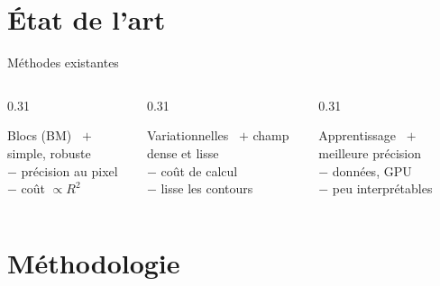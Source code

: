 \documentclass[aspectratio=169, 11pt]{beamer}
\begin{document}
\section{État de l'art}

\begin{frame}{Méthodes existantes}
  \begin{columns}[T]
    \begin{column}{0.31\textwidth}
      \begin{block}{Blocs (BM)~\cite{jain1981}}
        \small
        \textbf{$+$} simple, robuste\\
        \textbf{$-$} précision au pixel\\
        \textbf{$-$} coût $\propto R^2$
      \end{block}
    \end{column}
    \begin{column}{0.31\textwidth}
      \begin{block}{Variationnelles~\cite{horn1981}}
        \small
        \textbf{$+$} champ dense et lisse\\
        \textbf{$-$} coût de calcul\\
        \textbf{$-$} lisse les contours
      \end{block}
    \end{column}
    \begin{column}{0.31\textwidth}
      \begin{block}{Apprentissage~\cite{dosovitskiy2015, teed2020}}
        \small
        \textbf{$+$} meilleure précision\\
        \textbf{$-$} données, GPU\\
        \textbf{$-$} peu interprétables
      \end{block}
    \end{column}
  \end{columns}
\end{frame}

\section{Méthodologie}
\end{document}
